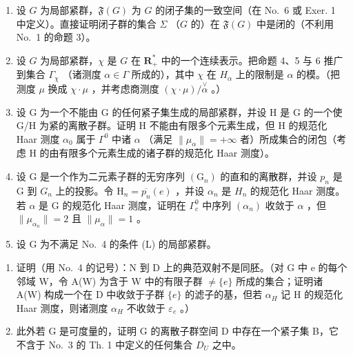 \begin{enumerate}
\def\labelenumi{\arabic{enumi})}
\setcounter{enumi}{1}
\item
  设 \(G\) 为局部紧群，\(\mathfrak{F}(G)\) 为 \(G\) 的闭子集的一致空间（在 No.~6 或 Exer. 1 中定义）。直接证明闭子群的集合 \(\Sigma\) （\(G\) 的）在 \(\mathfrak{F}(G)\) 中是闭的（不利用 No.~1 的命题 3）。
\item
  设 \(G\) 为局部紧群，\(\chi\) 是 \(G\) 在 \(\mathbf{R}_+^*\) 中的一个连续表示。把命题 4、5 与 6 推广到集合 \(\Gamma_{\chi}\) （诸测度 \(\alpha \in \Gamma\) 所成的），其中 \(\chi\) 在 \(H_{\alpha}\) 上的限制是 \(\alpha\) 的模。（把测度 \(\mu\) 换成 \(\chi \cdot \mu\) ，并考虑商测度 \((\chi \cdot \mu) / \overset{\vee}{\alpha}\) 。）
\item
  设 G 为一个不能由 G 的任何紧子集生成的局部紧群，并设 H 是 G 的一个使 G/H 为紧的离散子群。证明 H 不能由有限多个元素生成，但 H 的规范化 Haar 测度 \(\alpha_{0}\) 属于 \(\Gamma^{0}\) 中诸 \(\alpha\) （满足 \(\|\mu_{\alpha}\| = +\infty\) 者）所成集合的闭包（考虑 H 的由有限多个元素生成的诸子群的规范化 Haar 测度）。
\item
  设 G 是一个作为二元素子群的无穷序列 \((\mathrm{G}_{n})\) 的直和的离散群，并设 \(p_{n}\) 是 G 到 \(G_{n}\) 上的投影。令 \(\mathrm{H}_{n} = \overline{p_{n}}(e)\) ，并设 \(\alpha_{n}\) 是 \(H_{n}\) 的规范化 Haar 测度。若 \(\alpha\) 是 G 的规范化 Haar 测度，证明在 \(\Gamma_{c}^{0}\) 中序列 \((\alpha_{n})\) 收敛于 \(\alpha\) ，但 \(\|\mu_{\alpha_{n}}\| = 2\) 且 \(\|\mu_{\alpha}\| = 1\) 。
\item
  设 G 为不满足 No.~4 的条件 (L) 的局部紧群。
\end{enumerate}

\begin{enumerate}
\def\labelenumi{\alph{enumi})}
\item
  证明（用 No.~4 的记号）：N 到 D 上的典范双射不是同胚。（对 G 中 e 的每个邻域 W，令 A(W) 为含于 W 中的有限子群 \(\neq\{e\}\) 所成的集合；证明诸 A(W) 构成一个在 D 中收敛于子群 \(\{e\}\) 的滤子的基，但若 \(\alpha_{H}\) 记 H 的规范化 Haar 测度，则诸测度 \(\alpha_{H}\) 不收敛于 \(\varepsilon_{e}\) 。）
\item
  此外若 G 是可度量的，证明 G 的离散子群空间 D 中存在一个紧子集 B，它不含于 No.~3 的 Th. 1 中定义的任何集合 \(D_{U}\) 之中。
\end{enumerate}

